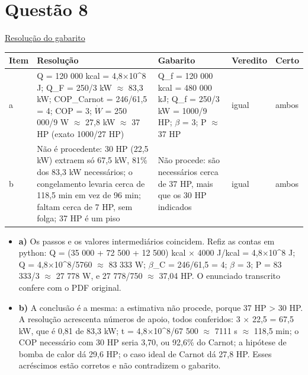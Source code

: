 \documentclass{article}%
\begin{document}
\section*{Questão 8}%
\href{https://poliedroresolve.sistemapoliedro.com.br/vestibulares/ime/2026/ime-2-fase-dia-2-24-10-2025-2-fase-dia-2/dissertativa-8-fisica-2-fase-dia-2-ime-2026}{Resolução do gabarito}\par\smallskip%
\begin{longtable}{@{}p{} p{} p{} p{} p{}@{}}\toprule Item & Resolução & Gabarito & Veredito & Certo \\ \midrule
a & Q = 120 000 kcal = 4,8$\times$10\^{}8 J; Q\_F = 250/3 kW $\approx$ 83,3 kW; COP\_Carnot = 246/61,5 = 4; COP = 3; $\dot W$ = 250 000/9 W $\approx$ 27,8 kW $\approx$ 37 HP (exato 1000/27 HP) & Q\_f = 120 000 kcal = 480 000 kJ; Q\_f = 250/3 kW = 1000/9 HP; $\beta$ = 3; P $\approx$ 37 HP & igual & ambos \\
b & Não é procedente: 30 HP (22,5 kW) extraem só 67,5 kW, 81\% dos 83,3 kW necessários; o congelamento levaria cerca de 118,5 min em vez de 96 min; faltam cerca de 7 HP, sem folga; 37 HP é um piso & Não procede: são necessários cerca de 37 HP, mais que os 30 HP indicados & igual & ambos \\
\bottomrule\end{longtable}%
\begin{itemize}%
\item%
\textbf{a)} Os passos e os valores intermediários coincidem. Refiz as contas em python: Q = (35 000 + 72 500 + 12 500) kcal $\times$ 4000 J/kcal = 4,8$\times$10\^{}8 J; Q = 4,8$\times$10\^{}8/5760 $\approx$ 83 333 W; $\beta$\_C = 246/61,5 = 4; $\beta$ = 3; P = 83 333/3 $\approx$ 27 778 W, e 27 778/750 $\approx$ 37,04 HP. O enunciado transcrito confere com o PDF original.%
\item%
\textbf{b)} A conclusão é a mesma: a estimativa não procede, porque 37 HP > 30 HP. A resolução acrescenta números de apoio, todos conferidos: 3 $\times$ 22,5 = 67,5 kW, que é 0,81 de 83,3 kW; t = 4,8$\times$10\^{}8/67 500 $\approx$ 7111 s $\approx$ 118,5 min; o COP necessário com 30 HP seria 3,70, ou 92,6\% do Carnot; a hipótese de bomba de calor dá 29,6 HP; o caso ideal de Carnot dá 27,8 HP. Esses acréscimos estão corretos e não contradizem o gabarito.%
\end{itemize}%
\end{document}
